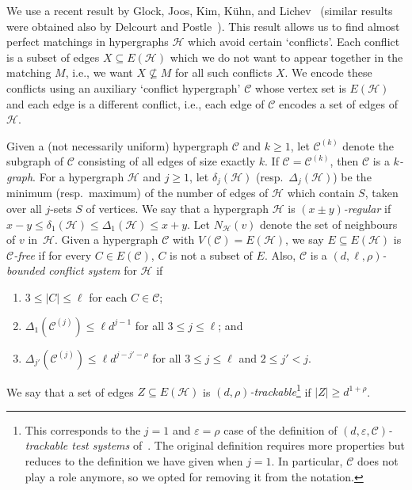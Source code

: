 \documentclass[a4paper, 11pt,reqno]{amsart}
\newcommand{\calC}{\mathcal{C}}
\newcommand{\calH}{\mathcal{H}}
\theoremstyle{plain}
\theoremstyle{definition}
\numberwithin{equation}{section}
\newcommand{\eps}{\varepsilon}
\begin{document}
We use a recent result by Glock, Joos, Kim, Kühn, and
Lichev~\cite{GJKKL2022} (similar results were obtained also by
Delcourt and Postle~\cite{DelcourtPostle2022}).  This result allows us
to find almost perfect matchings in hypergraphs $\calH$ which avoid
certain `conflicts'.  Each conflict is a subset of edges $X \subseteq
E(\calH)$ which we do not want to appear together in the matching $M$,
i.e., we want $X \not\subseteq M$ for all such conflicts $X$.  We
encode these conflicts using an auxiliary `conflict hypergraph'
$\calC$ whose vertex set is $E(\calH)$ and each edge is a different
conflict, i.e., each edge of $\calC$ encodes a set of edges of
$\calH$.

Given a (not necessarily uniform) hypergraph $\calC$ and $k \geq 1$, 
let $\calC^{(k)}$ denote the subgraph of $\calC$ consisting of all edges 
of size exactly $k$.  
If $\calC = \calC^{(k)}$, then $\calC$ is a \emph{$k$-graph}. 
For a hypergraph $\mathcal{H}$ and $j \geq 1$, 
let $\delta_j(\mathcal{H})$ (resp.\ $\Delta_j(\mathcal{H})$) be the 
minimum (resp.\ maximum) of the number of edges of $\mathcal{H}$ which contain $S$,
taken over all $j$-sets $S$ of vertices.
We say that a hypergraph $\mathcal{H}$ is \emph{$(x \pm y)$-regular} if $x - y \leq \delta_1(\mathcal{H}) \leq \Delta_1(\mathcal{H}) \leq x
+ y$.  
Let $N_{\calH}(v)$ denote the set of neighbours of $v$ in~$\calH$. 
Given a hypergraph $\mathcal{C}$ with $V(\mathcal{C}) = E(\mathcal{H})$, 
we say $E \subseteq E(\mathcal{H})$ is \emph{$\mathcal{C}$-free} 
if for every $C \in E(\mathcal{C})$, $C$ is not a subset of $E$. 
Also, $\mathcal{C}$ is a \emph{$(d, \ell, \rho)$-bounded conflict system} for $\calH$ if
\begin{enumerate}[(C1),labelindent=0pt,labelwidth=\widthof{\ref{c1last}},leftmargin=!]
	\item $3 \leq |C| \leq \ell$ for each $C \in \mathcal{C}$;
	\item $\Delta_1(\mathcal{C}^{(j)}) \leq \ell d^{j-1}$ for all $3 \leq j
	\leq \ell$; and 
	\item $\Delta_{j'}(\mathcal{C}^{(j)}) \leq \ell d^{j-j'-\rho}$ for all
	$3 \leq j \leq \ell$ and $2 \leq j' < j$.\label{c1last}
\end{enumerate}
We say that a set of edges $Z \subseteq E(\mathcal{H})$ is 
\emph{$(d, \rho)$-trackable}\footnote{ This corresponds to the $j=1$ and $\varepsilon = \rho$ case of the definition of \emph{$(d, \varepsilon, \mathcal{C})$-trackable test systems} of~\cite[Section 3]{GJKKL2022}. The original definition requires more properties but reduces to the definition we have given when $j=1$. In particular, $\mathcal{C}$ does not play a role anymore, so we opted for removing it from the notation.} if $|Z| \geq d^{1+\rho}$.
\end{document}
